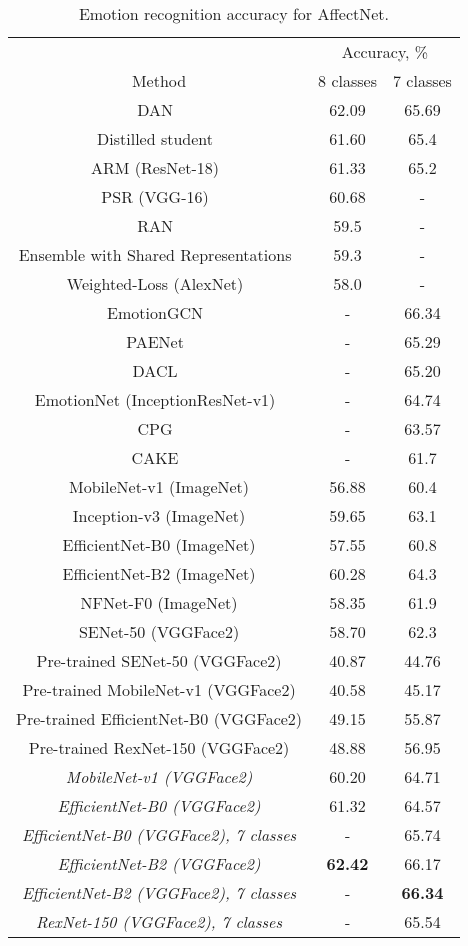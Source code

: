 \documentclass[runningheads]{llncs}
\begin{document}
\begin{table}[t]
\caption{Emotion recognition accuracy for AffectNet.}\label{tab1}
\centering
\begin{tabular}{|c|c|c|}
\hline
 & \multicolumn{2}{c|}{Accuracy, \% }\\
\cline{2-3}
Method & 8 classes & 7 classes\\
\hline
DAN~\cite{wen2021distract} & 62.09 & 65.69 \\
Distilled student~\cite{schoneveld2021leveraging} & 61.60 & 65.4 \\
ARM (ResNet-18)~\cite{shi2021learning} & 61.33 & 65.2 \\
PSR (VGG-16)~\cite{vo2020pyramid} & 60.68 & - \\
RAN~\cite{wang2020region} & 59.5 & - \\
Ensemble with Shared Representations~\cite{siqueira2020efficient} & 59.3 & - \\
Weighted-Loss (AlexNet)~\cite{mollahosseini2017affectnet} & 58.0 & - \\
\hline
EmotionGCN~\cite{antoniadis2021exploiting} & - & 66.34 \\
PAENet~\cite{hung2019increasingly} & - & 65.29 \\
DACL~\cite{farzaneh2021facial} & - & 65.20 \\
EmotionNet (InceptionResNet-v1)~\cite{hung2019increasingly} & - & 64.74 \\
CPG~\cite{hung2019compacting} & - & 63.57 \\
CAKE~\cite{kervadec2018cake} & - & 61.7 \\
\hline
MobileNet-v1 (ImageNet) & 56.88 & 60.4\\
Inception-v3 (ImageNet) & 59.65 & 63.1\\
EfficientNet-B0 (ImageNet) & 57.55 & 60.8\\
EfficientNet-B2 (ImageNet) & 60.28 & 64.3\\ NFNet-F0 (ImageNet) & 58.35 & 61.9\\
SENet-50 (VGGFace2) & 58.70 & 62.3\\
\hline
Pre-trained SENet-50 (VGGFace2) & 40.87 & 44.76\\
Pre-trained MobileNet-v1 (VGGFace2) & 40.58 & 45.17\\ Pre-trained EfficientNet-B0 (VGGFace2) & 49.15 & 55.87\\
Pre-trained RexNet-150 (VGGFace2) & 48.88 & 56.95\\
\hline
\it MobileNet-v1 (VGGFace2) & 60.20 & 64.71\\
\it EfficientNet-B0 (VGGFace2) & 61.32 & 64.57\\
\it EfficientNet-B0 (VGGFace2), 7 classes & - & 65.74\\
\it EfficientNet-B2 (VGGFace2) & \bf 62.42 & 66.17\\
\it EfficientNet-B2 (VGGFace2), 7 classes & - & \bf 66.34\\
\it RexNet-150 (VGGFace2), 7 classes & - & 65.54\\
\hline
\end{tabular}
\end{table}
\end{document}
